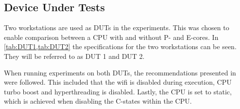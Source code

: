 \subsection{Device Under Tests}
Two workstations are used as DUTs in the experiments. This was chosen to enable comparison between a CPU with and without P- and E-cores. In \cref {tab:DUT1,tab:DUT2} the specifications for the two workstations can be seen. They will be referred to as DUT 1 and DUT 2. 




When running experiments on both DUTs, the recommendations presented in \cite{Lindholt2022} were followed. This included that the wifi is disabled during execution, CPU turbo boost and hyperthreading is disabled. Lastly, the CPU is set to static, which is achieved when disabling the C-states within the CPU.